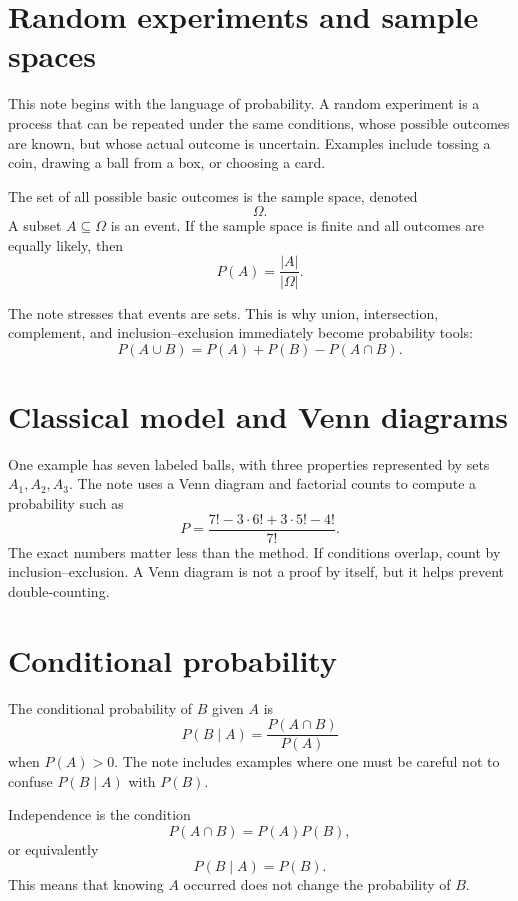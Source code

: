 
\section{Random experiments and sample spaces}

This note begins with the language of probability.  A random experiment is a process that can be repeated under the same conditions, whose possible outcomes are known, but whose actual outcome is uncertain.  Examples include tossing a coin, drawing a ball from a box, or choosing a card.

The set of all possible basic outcomes is the sample space, denoted
\[
  \Omega.
\]
A subset \(A\subseteq\Omega\) is an event.  If the sample space is finite and all outcomes are equally likely, then
\[
  P(A)=\frac{|A|}{|\Omega|}.
\]

The note stresses that events are sets.  This is why union, intersection, complement, and inclusion--exclusion immediately become probability tools:
\[
  P(A\cup B)=P(A)+P(B)-P(A\cap B).
\]

\section{Classical model and Venn diagrams}

One example has seven labeled balls, with three properties represented by sets \(A_1,A_2,A_3\).  The note uses a Venn diagram and factorial counts to compute a probability such as
\[
  P=\frac{7!-3\cdot6!+3\cdot5!-4!}{7!}.
\]
The exact numbers matter less than the method.  If conditions overlap, count by inclusion--exclusion.  A Venn diagram is not a proof by itself, but it helps prevent double-counting.

\section{Conditional probability}

The conditional probability of \(B\) given \(A\) is
\[
  P(B\mid A)=\frac{P(A\cap B)}{P(A)}
\]
when \(P(A)>0\).  The note includes examples where one must be careful not to confuse \(P(B\mid A)\) with \(P(B)\).

Independence is the condition
\[
  P(A\cap B)=P(A)P(B),
\]
or equivalently
\[
  P(B\mid A)=P(B).
\]
This means that knowing \(A\) occurred does not change the probability of \(B\).

